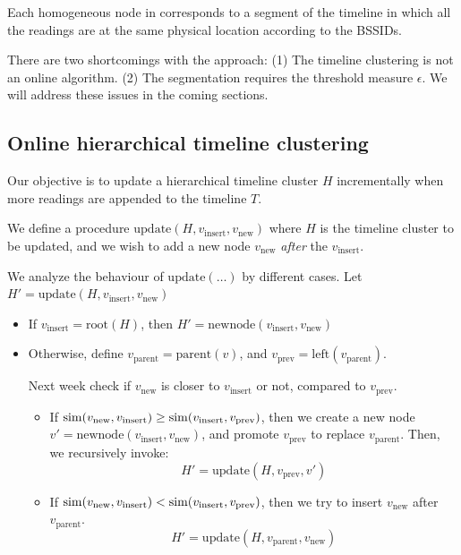 Each homogeneous node in corresponds to a segment of the timeline in which all
the readings are at the same physical location according to the BSSIDs.

There are two shortcomings with the approach:
(1) The timeline clustering is not an online algorithm.
(2) The segmentation requires the threshold measure $\epsilon$.
We will address these issues in the coming sections.

\subsection{Online hierarchical timeline clustering}

Our objective is to update a hierarchical timeline cluster $H$ incrementally when
more readings are appended to the timeline $T$.

We define a procedure $\mathrm{update}(H, v_\mathrm{insert}, v_\mathrm{new})$
where $H$ is the timeline cluster to be updated, and we wish to add a new node
$v_\mathrm{new}$ {\em after} the $v_\mathrm{insert}$.

We analyze the behaviour of $\mathrm{update}(\dots)$ by different cases.
Let $H' = \mathrm{update}(H, v_\mathrm{insert}, v_\mathrm{new})$

\begin{itemize}
    \item If $v_\mathrm{insert} = \mathrm{root}(H)$, then
        $H' = \mathrm{newnode}(v_\mathrm{insert}, v_\mathrm{new})$
    \item Otherwise, define $v_\mathrm{parent} = \mathrm{parent}(v)$, and
        $v_\mathrm{prev} = \mathrm{left}(v_\mathrm{parent})$.

        Next week check if $v_\mathrm{new}$ is closer to $v_\mathrm{insert}$ or
        not, compared to $v_\mathrm{prev}$.
        \begin{itemize}
            \item If $\mathrm{sim}(v_\mathrm{new}, v_\mathrm{insert}) \geq 
                      \mathrm{sim}(v_\mathrm{insert}, v_\mathrm{prev})$, then
                    we create a new node $v' = \mathrm{newnode}(v_\mathrm{insert},
                    v_\mathrm{new})$, and promote $v_\mathrm{prev}$ to replace
                    $v_\mathrm{parent}$.  Then, we recursively invoke:
                    $$H' = \mathrm{update}(H, v_\mathrm{prev}, v')$$
            \item If $\mathrm{sim}(v_\mathrm{new}, v_\mathrm{insert})  <
                      \mathrm{sim}(v_\mathrm{insert}, v_\mathrm{prev})$, then
                    we try to insert $v_\mathrm{new}$ after $v_\mathrm{parent}$.
                    $$H' = \mathrm{update}(H, v_\mathrm{parent}, v_\mathrm{new})$$
        \end{itemize}
\end{itemize}

